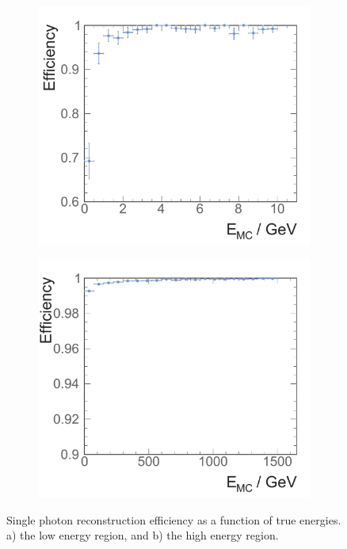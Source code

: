 \begin{figure}[tbph]
\centering
    \begin{subfigure}[b]{0.45\textwidth}
        \includegraphics[width=\textwidth]{photon/singlePhotonEff2fullEdt}
        \caption{}
        \label{fig:photonSingleEffLow}
    \end{subfigure}
    \begin{subfigure}[b]{0.45\textwidth}
        \includegraphics[width=\textwidth]{photon/singlePhotonEffEdt}
        \caption{}
        \label{fig:photonSingleEff}
    \end{subfigure}
\caption[Single photon reconstruction efficiency as a function of energy.]
{Single photon reconstruction efficiency as a function of true energies. a) the low energy region, and b) the high energy region.}
\label{fig:photonSingleEffPerformance}
\end{figure}



